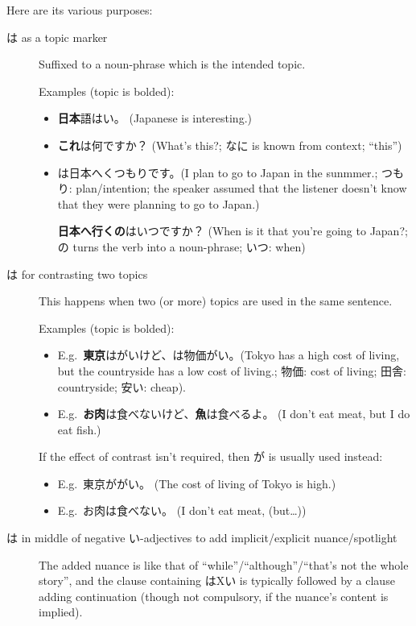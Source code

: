 \documentclass[../nihongo-gakushuu-kyouzai.tex]{subfiles}
\begin{document}
Here are its various purposes:
\begin{description}
    \item[は as a topic marker] Suffixed to a noun-phrase which is the intended topic.

    Examples (topic is bolded):
    \begin{itemize}
        \item \textbf{日本}語はい。 (Japanese is interesting.)
        \item \textbf{これ}は何ですか？ (What's this?; なに is known from context; ``this'')
        \item \textbf{}は日本へくつもりです。(I plan to go to Japan in the sunmmer.; つもり: plan/intention; the speaker assumed that the listener doesn't know that they were planning to go to Japan.)

        \textbf{日本へ行くの}はいつですか？ (When is it that you're going to Japan?; の turns the verb into a noun-phrase; いつ: when)
    \end{itemize}
    \item[は for contrasting two topics] This happens when two (or more) topics are used in the same sentence.

    Examples (topic is bolded):
    \begin{itemize}
        \item E.g.\ \textbf{東京}はがいけど、\textbf{}は物価がい。(Tokyo has a high cost of living, but the countryside has a low cost of living.; 物価: cost of living; 田舎: countryside; 安い: cheap).
        \item E.g.\ \textbf{お肉}は食べないけど、\textbf{魚}は食べるよ。 (I don't eat meat, but I do eat fish.)
    \end{itemize}

    If the effect of contrast isn't required, then が is usually used instead:

    \begin{itemize}
        \item E.g.\ 東京ががい。 (The cost of living of Tokyo is high.)
        \item E.g.\ お肉は食べない。 (I don't eat meat, (but\dots))
    \end{itemize}

    \item[は in middle of negative い-adjectives to add implicit/explicit nuance/spotlight] The added nuance is like that of ``while''/``although''/``that's not the whole story'', and the clause containing はXい is typically followed by a clause adding continuation (though not compulsory, if the nuance's content is implied).


\end{description}
\end{document}
